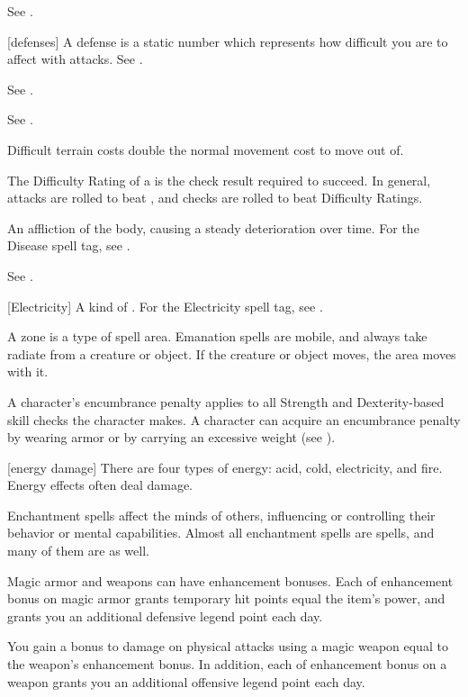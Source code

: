  See .

[defenses] A defense is a static number which represents how difficult you are to affect with attacks. See .

 See .

 See .

 Difficult terrain costs double the normal movement cost to move out of.

 The Difficulty Rating of a  is the check result required to succeed.
In general, attacks are rolled to beat , and checks are rolled to beat Difficulty Ratings.

 An affliction of the body, causing a steady deterioration over time. For the Disease spell tag, see .

 See .

[Electricity] A kind of . For the Electricity spell tag, see .

 A zone is a type of spell area.
Emanation spells are mobile, and always take radiate from a creature or object.
If the creature or object moves, the area moves with it.

 A character's encumbrance penalty applies to all Strength and Dexterity-based skill checks the character makes.
A character can acquire an encumbrance penalty by wearing armor or by carrying an excessive weight (see ).

[energy damage] There are four types of energy: acid, cold, electricity, and fire. Energy effects often deal damage.

 Enchantment spells affect the minds of others, influencing or controlling their behavior or mental capabilities. Almost all enchantment spells are  spells, and many of them are  as well.

 Magic armor and weapons can have enhancement bonuses.
Each  of enhancement bonus on magic armor grants temporary hit points equal the item's power, and grants you an additional defensive legend point each day.

You gain a bonus to damage on physical attacks using a magic weapon equal to the weapon's enhancement bonus.
In addition, each  of enhancement bonus on a weapon grants you an additional offensive legend point each day.

